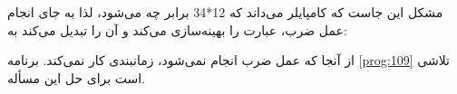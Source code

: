 \section{}
\paragraph{}\label{answer:16}
مشکل این جاست که کامپایلر می‌داند که 12*34 برابر چه می‌شود، لذا به جای انجام عمل ضرب، عبارت را بهینه‌سازی می‌کند و آن را تبدیل می‌کند به:

از آنجا که عمل ضرب انجام نمی‌شود، زمانبندی کار نمی‌کند. برنامه \ref{prog:109} تلاشی است برای حل این مسأله.
